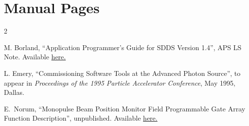\documentclass[11pt]{article}
\begin{document}
\section{Manual Pages}
\label{ManualPages}








































\begin{thebibliography}{2}

    M. Borland, ``Application Programmer's Guide for SDDS Version 1.4'', APS LS Note.
    Available \href{https://ops.aps.anl.gov/manuals/SDDStoolkit/SDDStoolkit.html}{here.}

        L. Emery, ``Commissioning Software Tools at the Advanced Photon Source'',
        to appear in {\em Proceedings of the 1995 Particle Accelerator Conference}, May 1995, Dallas.

        E.~Norum, ``Monopulse Beam Position Monitor Field Programmable Gate Array Function  Description'', unpublished. Available \href{https://icmsdocs.aps.anl.gov/new_docs/idcplg?IdcService=DISPLAY_URL&dDocName=APS_1198423}{here.}
\end{thebibliography}
\tableofcontents
\end{document}
